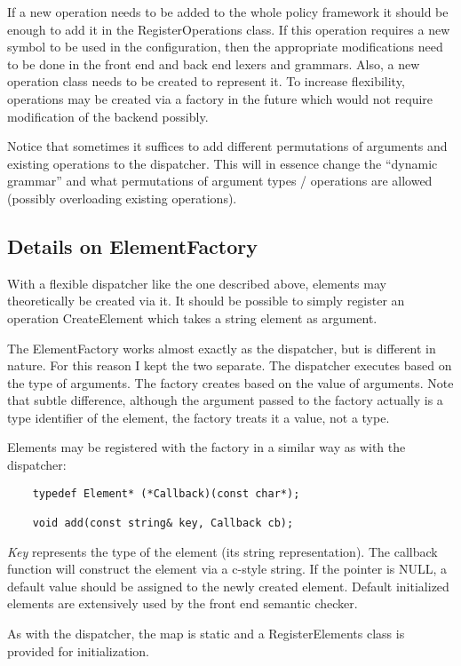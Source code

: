 \documentclass{article}
\begin{document}
If a new operation needs to be added to the whole policy framework it should be
enough to add it in the RegisterOperations class. If this operation requires a
new symbol to be used in the configuration, then the appropriate modifications
need to be done in the front end and back end lexers and grammars. Also, a new
operation class needs to be created to represent it. To increase flexibility,
operations may be created via a factory in the future which would not require
modification of the backend possibly.

Notice that sometimes it suffices to add different permutations of arguments and
existing operations to the dispatcher. This will in essence change the ``dynamic
grammar'' and what permutations of argument types / operations are allowed
(possibly overloading existing operations).

\subsection{Details on ElementFactory}
With a flexible dispatcher like the one described above, elements may
theoretically be created via it. It should be possible to simply register an
operation CreateElement which takes a string element as argument.

The ElementFactory works almost exactly as the dispatcher, but is different in
nature. For this reason I kept the two separate.  The dispatcher executes based
on the type of arguments. The factory creates based on the value of arguments.
Note that subtle difference, although the argument passed to the factory
actually is a type identifier of the element, the factory treats it a value, not
a type.

Elements may be registered with the factory in a similar way as with the
dispatcher:
\begin{verbatim}
    typedef Element* (*Callback)(const char*);

    void add(const string& key, Callback cb);
\end{verbatim}
{\em Key} represents the type of the element (its string representation). The callback
function will construct the element via a c-style string. If the pointer is NULL,
a default value should be assigned to the newly created element.  Default
initialized elements are extensively used by the front end semantic checker.

As with the dispatcher, the map is static and a RegisterElements class is
provided for initialization.
\end{document}
